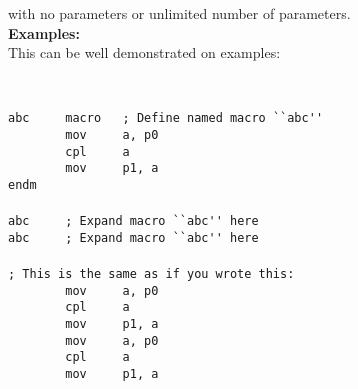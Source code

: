         with no parameters  or unlimited number of parameters.\\
        \textbf{Examples:}\\
        This can be well demonstrated on examples:
        {
            ~\\
            \usecodefont

                {\color{highlight_macro}\verb'abc'}\verb'     '{\color{highlight_directive}\verb'macro'}\verb'   '{\color{highlight_comment}\verb'; Define named macro ``abc'\verb"'"\verb''\verb"'"\verb''}\\
                \verb'        '{\color{highlight_instruction}\verb'mov'}\verb'     '{\color{highlight_sfr}\verb'a'}{\color{highlight_oper_sep}\verb','}\verb' '{\color{highlight_sfr}\verb'p0'}\\
                \verb'        '{\color{highlight_instruction}\verb'cpl'}\verb'     '{\color{highlight_sfr}\verb'a'}\\
                \verb'        '{\color{highlight_instruction}\verb'mov'}\verb'     '{\color{highlight_sfr}\verb'p1'}{\color{highlight_oper_sep}\verb','}\verb' '{\color{highlight_sfr}\verb'a'}\\
                {\color{highlight_directive}\verb'endm'}\\
                \verb''\\
                {\color{highlight_macro}\verb'abc'}\verb'     '{\color{highlight_comment}\verb'; Expand macro ``abc'\verb"'"\verb''\verb"'"\verb' here'}\\
                {\color{highlight_macro}\verb'abc'}\verb'     '{\color{highlight_comment}\verb'; Expand macro ``abc'\verb"'"\verb''\verb"'"\verb' here'}\\
                \verb''\\
                {\color{highlight_comment}\verb'; This is the same as if you wrote this:'}\\
                \verb'        '{\color{highlight_instruction}\verb'mov'}\verb'     '{\color{highlight_sfr}\verb'a'}{\color{highlight_oper_sep}\verb','}\verb' '{\color{highlight_sfr}\verb'p0'}\\
                \verb'        '{\color{highlight_instruction}\verb'cpl'}\verb'     '{\color{highlight_sfr}\verb'a'}\\
                \verb'        '{\color{highlight_instruction}\verb'mov'}\verb'     '{\color{highlight_sfr}\verb'p1'}{\color{highlight_oper_sep}\verb','}\verb' '{\color{highlight_sfr}\verb'a'}\\
                \verb'        '{\color{highlight_instruction}\verb'mov'}\verb'     '{\color{highlight_sfr}\verb'a'}{\color{highlight_oper_sep}\verb','}\verb' '{\color{highlight_sfr}\verb'p0'}\\
                \verb'        '{\color{highlight_instruction}\verb'cpl'}\verb'     '{\color{highlight_sfr}\verb'a'}\\
                \verb'        '{\color{highlight_instruction}\verb'mov'}\verb'     '{\color{highlight_sfr}\verb'p1'}{\color{highlight_oper_sep}\verb','}\verb' '{\color{highlight_sfr}\verb'a'}\\
           }
           

